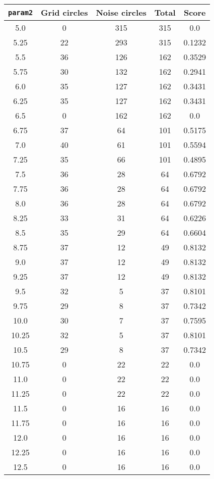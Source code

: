 \documentclass[letterpaper, 12pt]{article}
\begin{document}
\begin{longtable}{|c|c|c|c|c|}
\hline
\textbf{\texttt{param2}} & \textbf{Grid circles} & \textbf{Noise circles} & \textbf{Total} & \textbf{Score} \\
\hline
5.0 & 0 & 315 & 315 & 0.0 \\
\hline
5.25 & 22 & 293 & 315 & 0.1232 \\
\hline
5.5 & 36 & 126 & 162 & 0.3529 \\
\hline
5.75 & 30 & 132 & 162 & 0.2941 \\
\hline
6.0 & 35 & 127 & 162 & 0.3431 \\
\hline
6.25 & 35 & 127 & 162 & 0.3431 \\
\hline
6.5 & 0 & 162 & 162 & 0.0 \\
\hline
6.75 & 37 & 64 & 101 & 0.5175 \\
\hline
7.0 & 40 & 61 & 101 & 0.5594 \\
\hline
7.25 & 35 & 66 & 101 & 0.4895 \\
\hline
7.5 & 36 & 28 & 64 & 0.6792 \\
\hline
7.75 & 36 & 28 & 64 & 0.6792 \\
\hline
8.0 & 36 & 28 & 64 & 0.6792 \\
\hline
8.25 & 33 & 31 & 64 & 0.6226 \\
\hline
8.5 & 35 & 29 & 64 & 0.6604 \\
\hline
8.75 & 37 & 12 & 49 & 0.8132 \\
\hline
9.0 & 37 & 12 & 49 & 0.8132 \\
\hline
9.25 & 37 & 12 & 49 & 0.8132 \\
\hline
9.5 & 32 & 5 & 37 & 0.8101 \\
\hline
9.75 & 29 & 8 & 37 & 0.7342 \\
\hline
10.0 & 30 & 7 & 37 & 0.7595 \\
\hline
10.25 & 32 & 5 & 37 & 0.8101 \\
\hline
10.5 & 29 & 8 & 37 & 0.7342 \\
\hline
10.75 & 0 & 22 & 22 & 0.0 \\
\hline
11.0 & 0 & 22 & 22 & 0.0 \\
\hline
11.25 & 0 & 22 & 22 & 0.0 \\
\hline
11.5 & 0 & 16 & 16 & 0.0 \\
\hline
11.75 & 0 & 16 & 16 & 0.0 \\
\hline
12.0 & 0 & 16 & 16 & 0.0 \\
\hline
12.25 & 0 & 16 & 16 & 0.0 \\
\hline
12.5 & 0 & 16 & 16 & 0.0 \\

\end{longtable}
\end{document}

